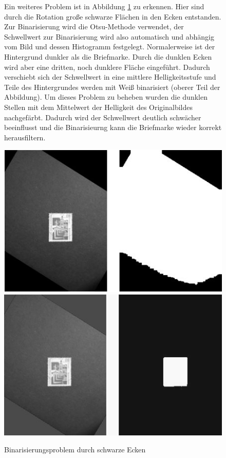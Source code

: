 \documentclass[12pt,toc=bib,toc=listof]{scrreprt}
\begin{document}
\begin{figure}[h]
\begin{minipage}[t]{.75\linewidth}

Ein weiteres Problem ist in Abbildung \ref{fig:bv_prob2} zu erkennen. Hier sind durch die Rotation große schwarze Flächen in den Ecken entstanden. Zur Binarisierung wird die Otsu-Methode verwendet, der Schwellwert zur Binarisierung wird also automatisch und abhängig vom Bild und dessen Histogramm festgelegt. Normalerweise ist der Hintergrund dunkler als die Briefmarke. Durch die dunklen Ecken wird aber eine dritten, noch dunklere Fläche eingeführt. Dadurch verschiebt sich der Schwellwert in eine mittlere Helligkeitsstufe und Teile des Hintergrundes werden mit Weiß binarisiert (oberer Teil der Abbildung). Um dieses Problem zu beheben wurden die dunklen Stellen mit dem Mittelwert der Helligkeit des Originalbildes nachgefärbt. Dadurch wird der Schwellwert deutlich schwächer beeinflusst und die Binarisieurng kann die Briefmarke wieder korrekt herausfiltern.
\end{minipage}
\hfill
\begin{minipage}[t]{.2\linewidth}
  \strut\vspace*{-\baselineskip}\newline\includegraphics[width=\linewidth]{./bilder/prob2_bad_bin}
  \includegraphics[width=\linewidth]{./bilder/prob2_good_bin}
  \caption{Binarisierungsproblem durch schwarze Ecken}
  \label{fig:bv_prob2}
\end{minipage}
\end{figure}
\end{document}
